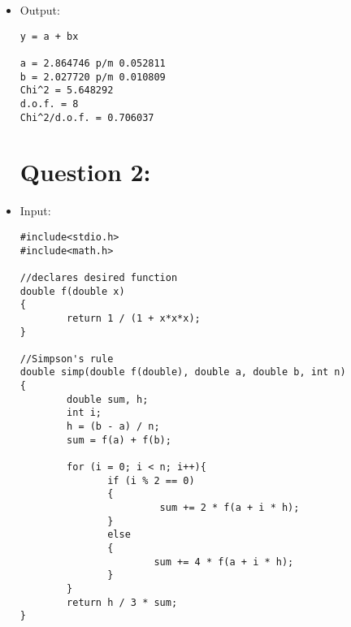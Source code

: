 \documentclass[10pt]{article}
\begin{document}
\begin{itemize}
\begin{verbatim}
        //Calculates the two parameters from above inverted matrix and constant
        for(i = 0;  i < 2; i++)
        {
                for(j = 0; j < 2; j++)
                {
                        a[i] += U_inv[i][j] * v[j];
                }
        }
        
        //Calculates the error of the parameters
        for(i = 0; i < 2; i++)
        {
                sigma[i] = sqrt(U_inv[i][i]);
        }
        
        printf("a = %f p/m %f\n", a[0], sigma[0]);
        printf("b = %f p/m %f\n", a[1], sigma[1]);
        
        //Calculates the chi-squared value per degree of freedom
        for(i = 0; i < N; i++)
        {
                f[i] = a[0] + a[1]*x[i];
                chi_squared += pow(((y[i] - f[i]) / yerror[i]),2);
        }

        printf("Chi^2 = %f\n", chi_squared);
        printf("d.o.f. = %d\n", (N-2));
        printf("Chi^2/d.o.f. = %f\n", chi_squared/(N-2));

        fclose(fout);

return 0;
}
\end{verbatim}
\item Output:
\begin{verbatim}
y = a + bx

a = 2.864746 p/m 0.052811
b = 2.027720 p/m 0.010809
Chi^2 = 5.648292
d.o.f. = 8
Chi^2/d.o.f. = 0.706037
\end{verbatim}

\section*{Question 2:}
\item Input:
\begin{verbatim}
#include<stdio.h>
#include<math.h>

//declares desired function
double f(double x)
{
        return 1 / (1 + x*x*x);
}

//Simpson's rule
double simp(double f(double), double a, double b, int n)
{
        double sum, h;
        int i;
        h = (b - a) / n;
        sum = f(a) + f(b);
        
        for (i = 0; i < n; i++){
               if (i % 2 == 0)
               {
                        sum += 2 * f(a + i * h);
               }
               else 
               {
                       sum += 4 * f(a + i * h);
               }
        }
        return h / 3 * sum;
}


\end{verbatim}
\end{itemize}
\end{document}
